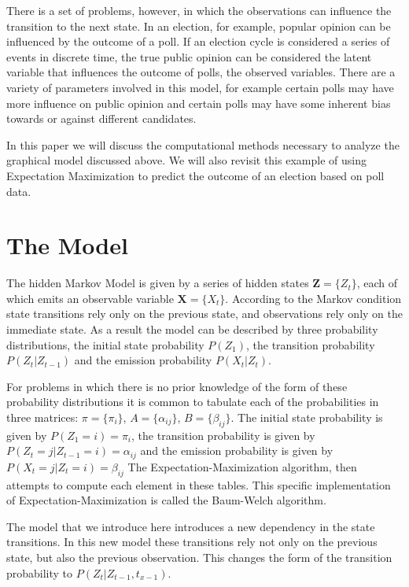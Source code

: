 \documentclass{amsart}
\theoremstyle{definition}
\theoremstyle{remark}
\numberwithin{equation}{section}
\begin{document}
There is a set of problems, however, in which the observations can influence the transition to the next state. In an election, for example, popular opinion can be influenced by the outcome of a poll. If an election cycle is considered a series of events in discrete time, the true public opinion can be considered the latent variable that influences the outcome of polls, the observed variables. There are a variety of parameters involved in this model, for example certain polls may have more influence on public opinion and certain polls may have some inherent bias towards or against different candidates.

In this paper we will discuss the computational methods necessary to analyze the graphical model discussed above. We will also revisit this example of using Expectation Maximization to predict the outcome of an election based on poll data.

\section{The Model}
The hidden Markov Model is given by a series of hidden states $\textbf{Z} = \{ Z_t\}$, each of which emits an observable variable $\textbf{X} = \{ X_t\}$. According to the Markov condition state transitions rely only on the previous state, and observations rely only on the immediate state. As a result the model can be described by three probability distributions, the initial state probability $P(Z_1)$, the transition probability $P(Z_t|Z_{t-1})$ and the emission probability $P(X_t|Z_t)$.

For problems in which there is no prior knowledge of the form of these probability distributions it is common to tabulate each of the probabilities in three matrices: $\pi = \{\pi_i\}$, $A = \{ \alpha_{ij}\}$, $B = \{ \beta_{ij}\}$. The initial state probability is given by $P(Z_1 = i) = \pi_i$, the transition probability is given by $P(Z_t = j | Z_{t-1} = i) = \alpha_{ij}$ and the emission probability is given by $P(X_t = j | Z_t = i) = \beta_{ij}$ The Expectation-Maximization algorithm, then attempts to compute each element in these tables. This specific implementation of Expectation-Maximization is called the Baum-Welch algorithm.

The model that we introduce here introduces a new dependency in the state transitions. In this new model these transitions rely not only on the previous state, but also the previous observation. This changes the form of the transition probability to $P(Z_t | Z_{t-1}, t_{x-1})$.
\end{document}
